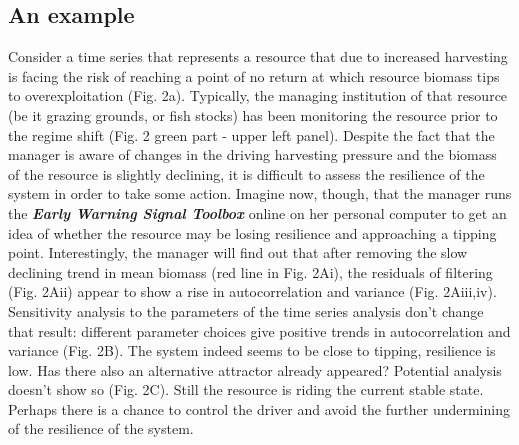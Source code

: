 \documentclass[12pt,a4paper,final]{article}
\begin{document}
\subsection{An example}
Consider a time series that represents a resource that due to increased harvesting is facing the risk of reaching a point of no return at which resource biomass tips to overexploitation (Fig. 2a). Typically, the managing institution of that resource (be it grazing grounds, or fish stocks) has been monitoring the resource prior to the regime shift (Fig. 2 green part - upper left panel). Despite the fact that the manager is aware of changes in the driving harvesting pressure and the biomass of the resource is slightly declining, it is difficult to assess the resilience of the system in order to take some action. Imagine now, though, that the manager runs the \textbf{\textit{Early Warning Signal Toolbox}} online on her personal computer to get an idea of whether the resource may be losing resilience and approaching a tipping point. Interestingly, the manager will find out that after removing the slow declining trend in mean biomass (red line in Fig. 2Ai), the residuals of filtering (Fig. 2Aii) appear to show a rise in autocorrelation and variance (Fig. 2Aiii,iv). Sensitivity analysis to the parameters of the time series analysis don't change that result: different parameter choices give positive trends in autocorrelation and variance (Fig. 2B). The system indeed seems to be close to tipping, resilience is low. Has there also an alternative attractor already appeared? Potential analysis doesn't show so (Fig. 2C). Still the resource is riding the current stable state. Perhaps there is a chance to control the driver and avoid the further undermining of the resilience of the system. 

\end{document}

